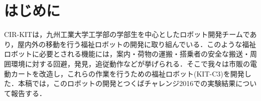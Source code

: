 \documentclass[10pt,a4paper]{jarticle}
\begin{document}
\section{はじめに}
\label{sec:intro}
CIR-KITは，九州工業大学工学部の学部生を中心としたロボット開発チームであり，屋内外の移動を行う福祉ロボットの開発に取り組んでいる．このような福祉ロボットに必要とされる機能には，案内・荷物の運搬・搭乗者の安全な搬送・周囲環境に対する回避，発見，追従動作などが挙げられる．そこで我々は市販の電動カートを改造し，これらの作業を行うための福祉ロボット(KIT-C3)を開発した．本稿では，このロボットの開発とつくばチャレンジ2016での実験結果について報告する．
\end{document}

